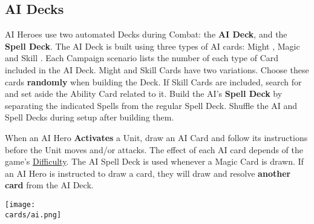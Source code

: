 \begin{multicols}{2}
{  \subsection*{AI Decks}
  AI Heroes use two automated Decks during Combat: the \textbf{AI Deck}, and the \textbf{Spell Deck}.
  The AI Deck is built using three types of AI cards: Might , Magic  and Skill .
  Each Campaign scenario lists the number of each type of Card included in the AI Deck.
  Might  and Skill  Cards have two variations. Choose these cards \textbf{randomly} when building the Deck.
  If Skill Cards are included, search for and set aside the Ability Card related to it.
  Build the AI's \textbf{Spell Deck} by separating the indicated Spells from the regular Spell Deck.
  Shuffle the AI and Spell Decks during setup after building them.\par
  When an AI Hero \textbf{Activates} a Unit, draw an AI Card and follow its instructions before the Unit moves and/or attacks.
  The effect of each AI card depends of the game's \hyperlink{Difficulty}{Difficulty}.
  The AI Spell Deck is used whenever a Magic Card  is drawn.
  If an AI Hero is instructed to draw a card, they will draw and resolve \textbf{another card} from the AI Deck.
}


\texttt{[image: \\cards/ai.png]}

\vfill

\pl{}


\end{multicols}
